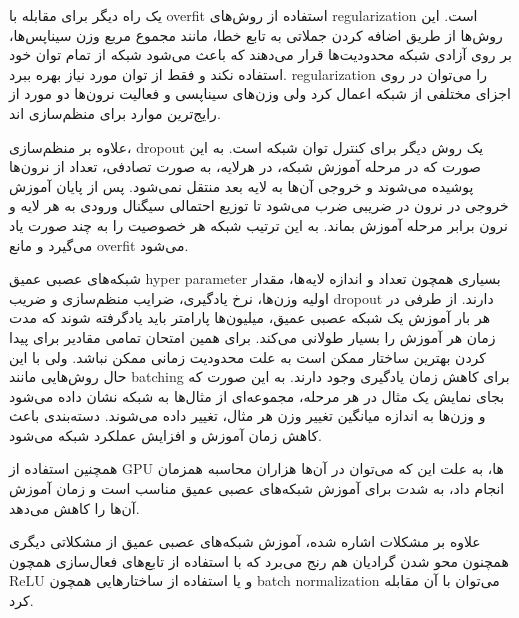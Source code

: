 یک راه دیگر برای مقابله با \gls{overfit} استفاده از روش‌های \gls{regularization}
است. این روش‌ها از طریق اضافه کردن جملاتی به تابع خطا، مانند مجموع مربع وزن
سیناپس‌ها، بر روی آزادی شبکه محدودیت‌ها قرار می‌دهند که باعث می‌شود شبکه از تمام
توان خود استفاده نکند و فقط از توان مورد نیاز بهره ببرد. \gls{regularization} را
می‌توان در روی اجزای مختلفی از شبکه اعمال کرد ولی وزن‌های سیناپسی و فعالیت
نرون‌ها دو مورد از رایج‌ترین موارد برای منظم‌سازی اند.

علاوه بر منظم‌سازی، dropout یک روش دیگر برای کنترل توان شبکه است. به این صورت که
در مرحله آموزش شبکه، در هرلایه، به صورت تصادفی، تعداد از نرون‌ها پوشیده می‌شوند
و خروجی آن‌ها به لایه بعد منتقل نمی‌شود. پس از پایان آموزش خروجی در نرون در
ضریبی ضرب می‌شود تا توزیع احتمالی سیگنال ورودی به هر لایه و نرون برابر مرحله
آموزش بماند. به این ترتیب شبکه‌ هر خصوصیت را به چند صورت یاد می‌گیرد و مانع
\gls{overfit} می‌شود.

شبکه‌های عصبی عمیق \gls{hyper parameter} بسیاری همچون تعداد و اندازه لایه‌ها،
مقدار اولیه وزن‌ها، نرخ یادگیری، ضرایب منظم‌سازی و ضریب dropout دارند. از طرفی
در هر بار آموزش یک شبکه عصبی عمیق، میلیون‌ها پارامتر باید یادگرفته شوند که مدت
زمان هر آموزش را بسیار طولانی می‌کند. برای همین امتحان تمامی مقادیر برای پیدا
کردن بهترین ساختار ممکن است به علت محدودیت زمانی ممکن نباشد. ولی با این حال
روش‌هایی مانند \gls{batching} برای کاهش زمان یادگیری وجود دارند. به این صورت که
بجای نمایش یک مثال در هر مرحله، مجموعه‌ای از مثال‌‌ها به شبکه نشان داده می‌شود و
وزن‌ها به اندازه میانگین تغییر وزن هر مثال، تغییر داده می‌شوند. دسته‌بندی باعث
کاهش زمان آموزش و افزایش عملکرد شبکه می‌شود.

همچنین استفاده از \gls{GPU} ها، به علت این که می‌توان در آن‌ها هزاران محاسبه همزمان
انجام داد، به شدت برای آموزش شبکه‌های عصبی عمیق مناسب است و زمان آموزش آن‌ها را
کاهش می‌دهد.

علاوه بر مشکلات اشاره شده، آموزش شبکه‌های عصبی عمیق از مشکلاتی دیگری همچنون محو
شدن گرادیان‌ هم رنج می‌برد که با استفاده از تابع‌های فعال‌سازی همچون ReLU و یا
استفاده از ساختارهایی همچون \gls{batch normalization} می‌توان با آن مقابله کرد.